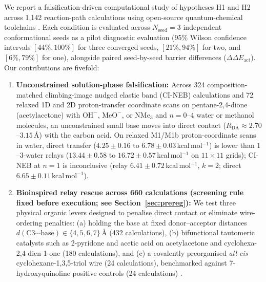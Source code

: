 \documentclass[11pt,a4paper]{article}
\begin{document}
We report a falsification-driven computational study of hypotheses H1 and H2 across 1{,}142 reaction-path calculations using open-source quantum-chemical toolchains \cite{bannwarth2019,ehlert2021,pracht2020,sun2020,wang2016}. Each condition is evaluated across $N_{\text{seed}} = 3$ independent conformational seeds as a pilot diagnostic evaluation (95\% Wilson confidence intervals $[44\%, 100\%]$ for three converged seeds, $[21\%, 94\%]$ for two, and $[6\%, 79\%]$ for one), alongside paired seed-by-seed barrier differences ($\Delta\Delta E_{\text{act}}$). Our contributions are fivefold:
\begin{enumerate}
\item \textbf{Unconstrained solution-phase falsification:} Across 324 composition-matched climbing-image nudged elastic band (CI-NEB) calculations and 72 relaxed 1D and 2D proton-transfer coordinate scans on pentane-2,4-dione (acetylacetone) with $\text{OH}^-$, $\text{MeO}^-$, or $\text{NMe}_3$ and $n = 0$--$4$ water or methanol molecules, an unconstrained small base moves into direct contact ($R_{\text{DA}} \approx 2.70$--$3.15$\,\AA{}) with the carbon acid. On relaxed M1/M1b proton-coordinate scans in water, direct transfer ($4.25 \pm 0.16$ to $6.78 \pm 0.03$\,kcal\,mol$^{-1}$) is lower than $1$--$3$-water relays ($13.44 \pm 0.58$ to $16.72 \pm 0.57$\,kcal\,mol$^{-1}$ on $11\times 11$ grids); CI-NEB at $n=1$ is inconclusive (relay $6.41 \pm 0.72$\,kcal\,mol$^{-1}$, $k=2$; direct $6.65 \pm 0.11$\,kcal\,mol$^{-1}$).
\item \textbf{Bioinspired relay rescue across 660 calculations (screening rule fixed before execution; see Section~\ref{sec:prereg}):} We test three physical organic levers designed to penalise direct contact or eliminate wire-ordering penalties: (a) holding the base at fixed donor--acceptor distances $d(\text{C3}\cdots\text{base}) \in \{4, 5, 6, 7\}$\,\AA{} (432 calculations), (b) bifunctional tautomeric catalysts such as 2-pyridone and acetic acid \cite{swain1952,bernasconi1987,capponi1986} on acetylacetone and cyclohexa-2,4-dien-1-one (180 calculations), and (c) a covalently preorganised \textit{all-cis} cyclohexane-1,3,5-triol wire (24 calculations), benchmarked against 7-hydroxyquinoline positive controls (24 calculations) \cite{tanner2003}.

\end{enumerate}
\end{document}
